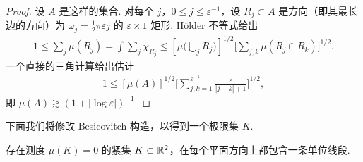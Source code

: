 \begin{proof}
设 $A$ 是这样的集合. 对每个 $j$，$0 \leq j \leq \varepsilon^{-1}$，设 $R_j \subset A$ 是方向（即其最长边的方向）为 $\omega_j = \tfrac{1}{2}\pi\varepsilon j$ 的 $\varepsilon \times 1$ 矩形. Hölder 不等式给出
\begin{align*}
  1\leq\sum_{j}\mu(R_{j})=\int\sum_{j}\chi_{R_{j}}
  \leq\left[\mu\Big(\bigcup_{j}R_{j}\Big)\right]^{1/2}\Big[\sum_{j,k}\mu(R_{j}\cap R_{k})\Big]^{1/2}.
\end{align*}
一个直接的三角计算给出估计
\begin{align*}
  1\leq\left[\mu(A)\right]^{1/2}\Big[\sum_{j,k=1}^{\varepsilon^{-1}}\frac{\varepsilon}{\left|j-k\right|+1}\Big]^{1/2},
\end{align*}
即 $\mu(A) \gtrsim (1 + |\log \varepsilon|)^{-1}$.
\end{proof}

下面我们将修改 Besicovitch 构造，以得到一个极限集 $K$.

\begin{theorem}\label{thm:3.4}
存在测度 $\mu(K) = 0$ 的紧集 $K \subset \mathbb{R}^2$，在每个平面方向上都包含一条单位线段.
\end{theorem}

